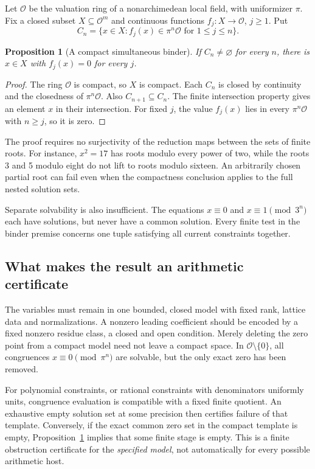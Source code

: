 \documentclass[11pt]{article}
\newtheorem{proposition}{Proposition}[section]
\theoremstyle{definition}\newtheorem{definition}[proposition]{Definition}
\newcommand{\OO}{\mathcal O}
\begin{document}
Let $\OO$ be the valuation ring of a nonarchimedean local field, with uniformizer $\pi$. Fix a closed subset $X\subseteq\OO^m$ and continuous functions $f_j:X\to\OO$, $j\geq1$. Put
\[
 C_n=\{x\in X:f_j(x)\in\pi^n\OO\text{ for }1\leq j\leq n\}.
 \tag{19.1}\label{eq:compact-Cn}
\]

\begin{proposition}[A compact simultaneous binder]\label{prop:compact}
If $C_n\neq\varnothing$ for every $n$, there is $x\in X$ with $f_j(x)=0$ for every $j$.
\end{proposition}
\begin{proof}
The ring $\OO$ is compact, so $X$ is compact. Each $C_n$ is closed by continuity and the closedness of $\pi^n\OO$. Also $C_{n+1}\subseteq C_n$. The finite intersection property gives an element $x$ in their intersection. For fixed $j$, the value $f_j(x)$ lies in every $\pi^n\OO$ with $n\geq j$, so it is zero.
\end{proof}

The proof requires no surjectivity of the reduction maps between the sets of finite roots. For instance, $x^2=17$ has roots modulo every power of two, while the roots 3 and 5 modulo eight do not lift to roots modulo sixteen. An arbitrarily chosen partial root can fail even when the compactness conclusion applies to the full nested solution sets.

Separate solvability is also insufficient. The equations $x\equiv0$ and $x\equiv1\pmod{3^n}$ each have solutions, but never have a common solution. Every finite test in the binder premise concerns one tuple satisfying all current constraints together.

\subsection{What makes the result an arithmetic certificate}
The variables must remain in one bounded, closed model with fixed rank, lattice data and normalizations. A nonzero leading coefficient should be encoded by a fixed nonzero residue class, a closed and open condition. Merely deleting the zero point from a compact model need not leave a compact space. In $\OO\setminus\{0\}$, all congruences $x\equiv0\pmod{\pi^n}$ are solvable, but the only exact zero has been removed.

For polynomial constraints, or rational constraints with denominators uniformly units, congruence evaluation is compatible with a fixed finite quotient. An exhaustive empty solution set at some precision then certifies failure of that template. Conversely, if the exact common zero set in the compact template is empty, Proposition~\ref{prop:compact} implies that some finite stage is empty. This is a finite obstruction certificate for the \emph{specified model}, not automatically for every possible arithmetic host.
\end{document}

